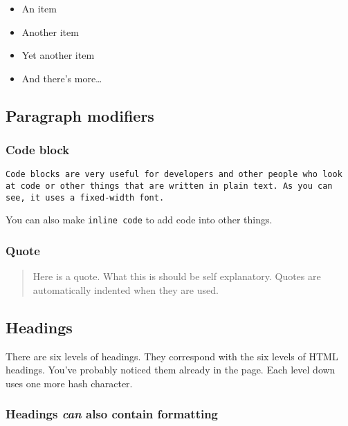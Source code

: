 \begin{itemize}
\tightlist
\item
  An item
\item
  Another item
\item
  Yet another item
\item
  And there's more\ldots{}
\end{itemize}

\hypertarget{paragraph-modifiers}{%
\subsection{Paragraph modifiers}\label{paragraph-modifiers}}

\hypertarget{code-block}{%
\subsubsection{Code block}\label{code-block}}

\begin{verbatim}
Code blocks are very useful for developers and other people who look at code or other things that are written in plain text. As you can see, it uses a fixed-width font.
\end{verbatim}

You can also make \texttt{inline\ code} to add code into other things.

\hypertarget{quote}{%
\subsubsection{Quote}\label{quote}}

\begin{quote}
Here is a quote. What this is should be self explanatory. Quotes are
automatically indented when they are used.
\end{quote}

\hypertarget{headings}{%
\subsection{Headings}\label{headings}}

There are six levels of headings. They correspond with the six levels of
HTML headings. You've probably noticed them already in the page. Each
level down uses one more hash character.

\hypertarget{headings-can-also-contain-formatting}{%
\subsubsection{\texorpdfstring{Headings \emph{can} also contain
\textbf{formatting}}{Headings can also contain formatting}}\label{headings-can-also-contain-formatting}}


